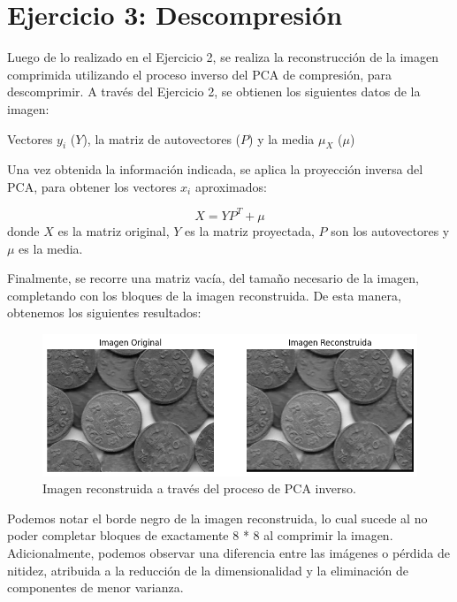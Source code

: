 \documentclass[a4paper,12pt]{article}
\begin{document}
\newpage
\section*{Ejercicio 3: Descompresión}

Luego de lo realizado en el Ejercicio 2, se realiza la reconstrucción de la imagen comprimida utilizando el proceso inverso del PCA de compresión, para descomprimir.
A través del Ejercicio 2, se obtienen los siguientes datos de la imagen:

\vspace{1em}

Vectores \(y_i\) (\(Y\)), la matriz de autovectores (\(P\)) y la media \(\mu_X\) (\(\mu\))

\vspace{1em}

Una vez obtenida la información indicada, se aplica la proyección inversa del PCA, para obtener los vectores \(x_i\) aproximados:

\vspace{1em}

\[
X = Y P^T + \mu
\]
donde \(X\) es la matriz original, \(Y\) es la matriz proyectada, \(P\) son los autovectores y \(\mu\) es la media.

\vspace{1em}

Finalmente, se recorre una matriz vacía, del tamaño necesario de la imagen, completando con los bloques de la imagen reconstruida.
De esta manera, obtenemos los siguientes resultados:

\begin{figure}[H]
    \centering
    \includegraphics[width=1\textwidth]{Ejercicio3.png}
    \caption{Imagen reconstruida a través del proceso de PCA inverso.}
    \label{fig:ej3}
\end{figure}

Podemos notar el borde negro de la imagen reconstruida, lo cual sucede al no poder completar bloques de exactamente 8 * 8 al comprimir la imagen.
Adicionalmente, podemos observar una diferencia entre las imágenes o pérdida de nitidez, atribuida a la reducción de la dimensionalidad y la eliminación de componentes de menor varianza.
\end{document}

